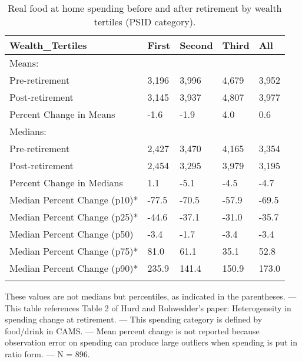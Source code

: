 \begin{table}[tbp] \centering
{}

\caption{Real food at home spending before and after retirement by wealth tertiles (PSID category).}
\begin{tabularx}{\textwidth}{lCCCC}

\toprule
{Wealth\_Tertiles}&{First}&{Second}&{Third}&{All} \tabularnewline
\midrule\addlinespace[1.5ex]
Means:&&&& \tabularnewline
\midrule Pre-retirement&3,196&3,996&4,679&3,952 \tabularnewline
Post-retirement&3,145&3,937&4,807&3,977 \tabularnewline
Percent Change in Means&-1.6&-1.9&4.0&0.6 \tabularnewline
\midrule Medians:&&&& \tabularnewline
\midrule Pre-retirement&2,427&3,470&4,165&3,354 \tabularnewline
Post-retirement&2,454&3,295&3,979&3,195 \tabularnewline
Percent Change in Medians&1.1&-5.1&-4.5&-4.7 \tabularnewline
Median Percent Change (p10)*&-77.5&-70.5&-57.9&-69.5 \tabularnewline
Median Percent Change (p25)*&-44.6&-37.1&-31.0&-35.7 \tabularnewline
Median Percent Change (p50)&-3.4&-1.7&-3.4&-3.4 \tabularnewline
Median Percent Change (p75)*&81.0&61.1&35.1&52.8 \tabularnewline
Median Percent Change (p90)*&235.9&141.4&150.9&173.0 \tabularnewline
\bottomrule \addlinespace[1.5ex]

\end{tabularx}
\begin{flushleft}
\footnotesize *These values are not medians but percentiles, as indicated in the parentheses. \linebreak --- \linebreak This table references Table 2 of Hurd and Rohwedder's paper: Heterogeneity in spending change at retirement. \linebreak --- \linebreak This spending category is defined by food/drink in CAMS. \linebreak --- \linebreak Mean percent change is not reported because observation error on spending can produce large outliers when spending is put in ratio form. \linebreak --- \linebreak N = 896.
\end{flushleft}
\end{table}
